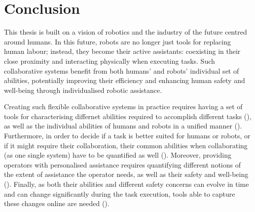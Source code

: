 \chapter{Conclusion}
\label{ch:thesis_conclusion}

This thesis is built on a vision of robotics and the industry of the future centred around humans. In this future, robots are no longer just tools for replacing human labour; instead, they become their active assistants: coexisting in their close proximity and interacting physically when executing tasks. Such collaborative systems benefit from both humans' and robots' individual set of abilities, potentially improving their efficiency and enhancing human safety and well-being through individualised robotic assistance. 




Creating such flexible collaborative systems in practice requires having a set of tools for characterising differnet abilities required to accomplish different tasks (), as well as the individual abilities of humans and robots in a unified manner (). Furthermore, in order to decide if a task is better suited for humans or robots, or if it might require their collaboration, their common abilities when collaborating (as one single system) have to be quantified as well (). Moreover, providing operators with personalised assistance requires quantifying different notions of the extent of assistance the operator needs, as well as their safety and well-being (). Finally, as both their abilities and different safety concerns can evolve in time and can change significantly during the task execution, tools able to capture these changes online are needed (). 

